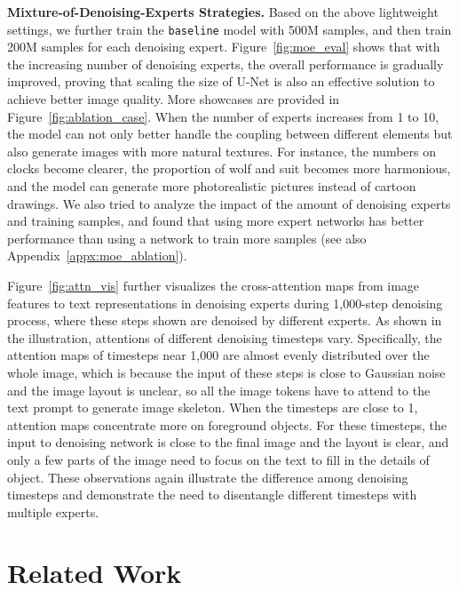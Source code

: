 \documentclass[10pt,twocolumn,letterpaper]{article}
\begin{document}
\noindent\textbf{Mixture-of-Denoising-Experts Strategies.}
Based on the above lightweight settings, we further train the \verb|baseline| model with 500M samples, and then train 200M samples for each denoising expert.
Figure~\ref{fig:moe_eval} shows that with the increasing number of denoising experts, the overall performance is gradually improved, proving that scaling the size of U-Net is also an effective solution to achieve better image quality.
More showcases are provided in Figure~\ref{fig:ablation_case}. 
When the number of experts increases from 1 to 10, the model can not only better handle the coupling between different elements but also generate images with more natural textures. For instance, the numbers on clocks become clearer, the proportion of wolf and suit becomes more harmonious, and the model can generate more photorealistic pictures instead of cartoon drawings.
We also tried to analyze the impact of the amount of denoising experts and training samples, and found that using more expert networks has better performance than using a network to train more samples (see also Appendix~\ref{appx:moe_ablation}).

Figure~\ref{fig:attn_vis} further visualizes the cross-attention maps from image features to text representations in denoising experts during 1,000-step denoising process, where these steps shown are denoised by different experts.
As shown in the illustration, attentions of different denoising timesteps vary. 
Specifically, the attention maps of timesteps  near 1,000 are almost evenly distributed over the whole image, which is because the input of these steps is close to Gaussian noise and the image layout is unclear, so all the image tokens have to attend to the text prompt to generate image skeleton.
When the timesteps are close to 1, attention maps concentrate more on foreground objects. For these timesteps, the input to denoising network is close to the final image and the layout is clear, and only a few parts of the image need to focus on the text to fill in the details of object.
These observations again illustrate the difference among denoising timesteps and demonstrate the need to disentangle different timesteps with multiple experts.

\section{Related Work}
\end{document}
